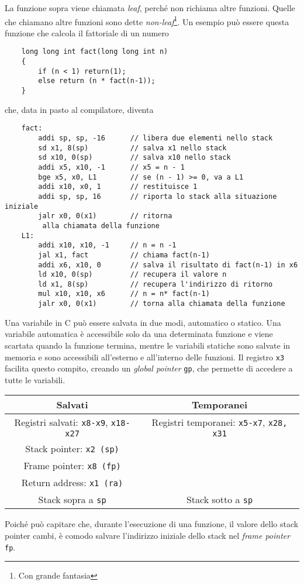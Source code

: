 \documentclass[a4paper,12pt]{article}
\theoremstyle{break}
\newcommand{\code}[1]{\texttt{#1}}
\numberwithin{equation}{section}
\begin{document}
La funzione sopra viene chiamata \textit{leaf}, perché non richiama altre funzioni.
Quelle che chiamano altre funzioni sono dette \textit{non-leaf}\footnote{Con grande fantasia}. 
Un esempio può essere questa funzione che calcola il fattoriale di un numero
\begin{verbatim}
    long long int fact(long long int n)
    {
        if (n < 1) return(1);
        else return (n * fact(n-1));
    }
\end{verbatim}
che, data in pasto al compilatore, diventa
\begin{verbatim}
    fact:
        addi sp, sp, -16      // libera due elementi nello stack
        sd x1, 8(sp)          // salva x1 nello stack
        sd x10, 0(sp)         // salva x10 nello stack
        addi x5, x10, -1      // x5 = n - 1
        bge x5, x0, L1        // se (n - 1) >= 0, va a L1
        addi x10, x0, 1       // restituisce 1
        addi sp, sp, 16       // riporta lo stack alla situazione iniziale
        jalr x0, 0(x1)        // ritorna
         alla chiamata della funzione 
    L1: 
        addi x10, x10, -1     // n = n -1
        jal x1, fact          // chiama fact(n-1)
        addi x6, x10, 0       // salva il risultato di fact(n-1) in x6
        ld x10, 0(sp)         // recupera il valore n
        ld x1, 8(sp)          // recupera l'indirizzo di ritorno
        mul x10, x10, x6      // n = n* fact(n-1)
        jalr x0, 0(x1)        // torna alla chiamata della funzione
    \end{verbatim}
Una variabile in C può essere salvata in due modi, automatico o statico. Una variabile automatica è accessibile solo da una determinata funzione e viene scartata quando la funzione termina, mentre le variabili statiche sono salvate in memoria e sono accessibili all'esterno e all'interno delle funzioni. Il registro \code{x3} facilita questo compito, creando un \textit{global pointer} \code{gp}, che permette di accedere a tutte le variabili.
\begin{center}
    \begin{tabular}{|c|c|}
        \hline
        Salvati & Temporanei \\
        \hline
        Registri salvati: \code{x8-x9}, \code{x18-x27} & Registri temporanei: \code{x5-x7}, \code{x28, x31} \\
        Stack pointer: \code{x2 (sp)} & \\
        Frame pointer: \code{x8 (fp)} & \\
        Return address: \code{x1 (ra)} & \\
        Stack sopra a \code{sp} & Stack sotto a \code{sp} \\
        \hline
    \end{tabular}
\end{center}
Poiché può capitare che, durante l'esecuzione di una funzione, il valore dello stack pointer cambi, è comodo salvare l'indirizzo iniziale dello stack nel \textit{frame pointer} \code{fp}.
\end{document}
